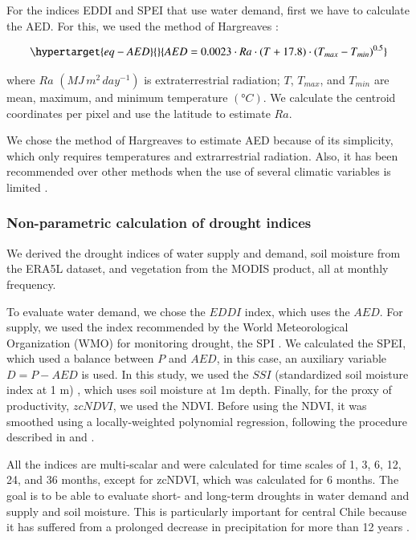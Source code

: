 \documentclass[
  authoryear,
  preprint,
  3p,
  onecolumn]{elsarticle}
\begin{document}
For the indices EDDI and SPEI that use water demand, first we have to
calculate the AED. For this, we used the method of Hargreaves
\citep{Hargreaves1994, Hargreaves1985}:

\begin{equation}\protect\hypertarget{eq-AED}{}{AED = 0.0023\cdot Ra\cdot (T+17.8)\cdot (T_{max}-T_{min})^{0.5}}\label{eq-AED}\end{equation}

where \(Ra\) \((MJ\,m^2\, day^{-1})\) is extraterrestrial radiation;
\(T\), \(T_{max}\), and \(T_{min}\) are mean, maximum, and minimum
temperature \((°C)\). We calculate the centroid coordinates per pixel
and use the latitude to estimate \(Ra\).

We chose the method of Hargreaves to estimate AED because of its
simplicity, which only requires temperatures and extrarrestrial
radiation. Also, it has been recommended over other methods when the use
of several climatic variables is limited \citep{Vicente-Serrano2014}.

\hypertarget{non-parametric-calculation-of-drought-indices}{%
\subsubsection{Non-parametric calculation of drought
indices}\label{non-parametric-calculation-of-drought-indices}}

We derived the drought indices of water supply and demand, soil moisture
from the ERA5L dataset, and vegetation from the MODIS product, all at
monthly frequency.

To evaluate water demand, we chose the \(EDDI\)
\citep{Hobbins2016, McEvoy2016} index, which uses the \(AED\). For
supply, we used the index recommended by the World Meteorological
Organization (WMO) for monitoring drought, the SPI \citep{Mckee1993}. We
calculated the SPEI, which used a balance between \(P\) and \(AED\), in
this case, an auxiliary variable \(D = P-AED\) is used. In this study,
we used the \(SSI\) (standardized soil moisture index at 1 m)
\citep{Hao2013, AghaKouchak2014}, which uses soil moisture at 1m depth.
Finally, for the proxy of productivity, \(zcNDVI\), we used the NDVI.
Before using the NDVI, it was smoothed using a locally-weighted
polynomial regression, following the procedure described in
\citet{Zambrano2018} and \citet{Zambrano2016}.

All the indices are multi-scalar and were calculated for time scales of
1, 3, 6, 12, 24, and 36 months, except for zcNDVI, which was calculated
for 6 months. The goal is to be able to evaluate short- and long-term
droughts in water demand and supply and soil moisture. This is
particularly important for central Chile because it has suffered from a
prolonged decrease in precipitation for more than 12 years
\citep{Garreaud2020, Boisier2018, Garreaud2017}.
\end{document}
